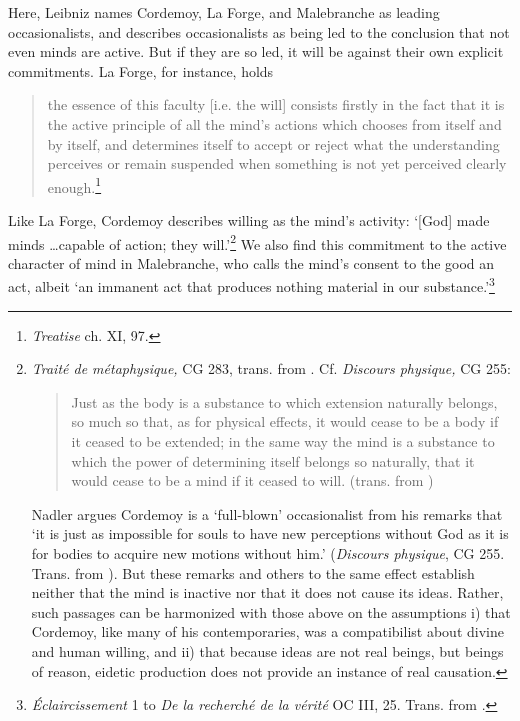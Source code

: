 \documentclass[]{article}
\begin{document}
Here, Leibniz names Cordemoy, La Forge, and Malebranche as leading occasionalists, and describes occasionalists as being led to the conclusion that not even minds are active. But if they are so led, it will be against their own explicit commitments. La Forge, for instance, holds

\begin{quote}
	the essence of this faculty {[}i.e. the will{]} consists firstly in the fact that it is the active principle of all the mind's actions which chooses from itself and by itself, and determines itself to accept or reject what the understanding perceives or remain suspended when something is not yet perceived clearly enough.\footnote{\emph{Treatise} ch. XI, 97.}
\end{quote}

Like La Forge, Cordemoy describes willing as the mind's activity: `{[}God{]} made minds \ldots capable of action; they will.'\footnote{\emph{Traité de métaphysique,} CG 283, trans. from \autocite[52]{Nadler2005}. Cf. \emph{Discours physique,} CG 255:
	
	\begin{quote}
		Just as the body is a substance to which extension naturally belongs, so much so that, as for physical effects, it would cease to be a body if it ceased to be extended; in the same way the mind is a substance to which the power of determining itself belongs so naturally, that it would cease to be a mind if it ceased to will. (trans. from \autocite[47]{Nadler2005})
	\end{quote}
	
	Nadler argues Cordemoy is a `full-blown' occasionalist from his remarks that `it is just as impossible for souls to have new perceptions without God as it is for bodies to acquire new motions without him.' (\emph{Discours physique}, CG 255. Trans. from \autocite[50]{Nadler2005}). But these remarks and others to the same effect establish neither that the mind is inactive nor that it does not cause its ideas. Rather, such passages can be harmonized with those above on the assumptions i) that Cordemoy, like many of his contemporaries, was a compatibilist about divine and human willing, and ii) that because ideas are not real beings, but beings of reason, eidetic production does not provide an instance of real causation.} We also find this commitment to the active character of mind in Malebranche, who calls the mind's consent to the good an act, albeit `an immanent act that produces nothing material in our substance.'\footnote{\emph{Éclaircissement} 1 to \emph{De la recherché de la vérité} OC III, 25. Trans. from \autocite[52]{Nadler2005}.}
\end{document}
